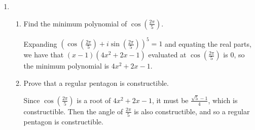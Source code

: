 \documentclass[12pt]{article}
\begin{document}
\begin{enumerate}
    \item 
    \begin{enumerate}
        \item Find the minimum polynomial of $\cos\left( \frac{2 \pi}{5} \right)$. \par
            Expanding $(\cos\left(\frac{2\pi}{5}\right) + i\sin\left(\frac{2\pi}{5}\right))^5 = 1$ and equating the real parts, we have that $(x - 1)(4x^2 + 2x - 1)$ evaluated at $\cos\left(\frac{2\pi}{5}\right)$ is $0$, so the minimum polynomial is $4x^2 + 2x - 1$.
        \item Prove that a regular pentagon is constructible. \par
            Since $\cos\left(\frac{2\pi}{5}\right)$ is a root of $4x^2 + 2x - 1$, it must be $\frac{\sqrt{5} - 1}{4}$, which is constructible. Then the angle of $\frac{2\pi}{5}$ is also constructible, and so a regular pentagon is constructible.
    \end{enumerate}
\end{enumerate}
\end{document}
